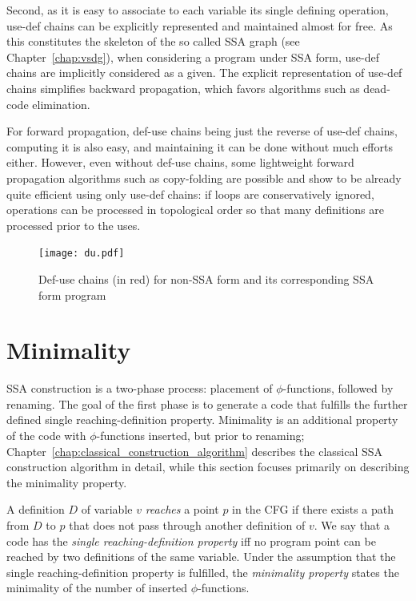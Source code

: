 Second, as it is easy to associate to each variable its single defining operation, use-def chains can be explicitly represented and maintained almost for free. As this constitutes the skeleton of the so called SSA graph (see Chapter~\ref{chap:vsdg}), when considering a program under SSA form, use-def chains are implicitly considered as a given. 
The explicit representation of use-def chains simplifies backward 
propagation, which favors algorithms such as dead-code elimination. 

For forward propagation, def-use chains being just the reverse of use-def chains, computing it is also easy, and maintaining it can be done without much efforts either. 
However, even without def-use chains, some lightweight forward propagation algorithms such as copy-folding are possible and show to be already quite efficient using only use-def chains: if loops are conservatively ignored, operations can be processed in topological order so that many definitions are processed prior to the uses. 


\begin{figure}
\texttt{[image: du.pdf]}
\caption{\label{fig:properties_and_flavors:du} Def-use chains (in red) for non-SSA form and its corresponding SSA form program} 
\end{figure}



\section{Minimality}
\label{sec:properties_and_flavors:minimality}

SSA construction is a two-phase process: placement of $\phi$-functions,
followed by renaming. The goal of the first phase is to generate a code that fulfills the further defined single reaching-definition property. Minimality is an additional property of the code with 
$\phi$-functions inserted, but prior to renaming; Chapter~\ref{chap:classical_construction_algorithm} describes the classical SSA
construction algorithm in detail, while this section focuses
primarily on describing the minimality property.  

A definition $D$ of variable $v$ \emph{reaches} a point $p$ in the CFG
if there exists a path from $D$ to $p$ that does not pass through another
definition of $v$. We say that a code has the \emph{single reaching-definition property} iff no program point can be reached by two definitions of the same variable. 
Under the assumption that the single reaching-definition property is fulfilled, the \emph{minimality property} states the minimality of the number of inserted $\phi$-functions.

